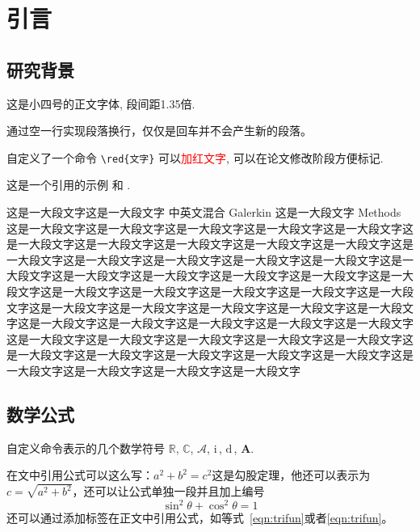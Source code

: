 \documentclass{shnuthesis}
\newcommand{\CC}{\ensuremath{\mathbb{C}}}
\newcommand{\RR}{\ensuremath{\mathbb{R}}}
\newcommand{\A}{\mathcal{A}}
\newcommand{\ii}{\bm{\mathrm{i}}\,}  %
\newcommand{\md}{\mathrm{d}\,}
\newcommand{\bA}{\boldsymbol{A}}
\newcommand{\red}[1]{\textcolor{red}{#1}}
\begin{document}
    \maketoc[pagenumtoc]


	\clearpage %

    \mainmatter



\chapter{引言}

\section{研究背景}
这是小四号的正文字体, 段间距1.35倍.
	
通过空一行实现段落换行，仅仅是回车并不会产生新的段落。

自定义了一个命令 \verb|\red{文字}| 可以\red{加红文字}, 可以在论文修改阶段方便标记.

这是一个引用的示例 \cite{Adams1975}和 \cite{Shen1994,Tadmor2012}.

这是一大段文字这是一大段文字 中英文混合 Galerkin 这是一大段文字 Methods 这是一大段文字这是一大段文字这是一大段文字这是一大段文字这是一大段文字这是一大段文字这是一大段文字这是一大段文字这是一大段文字这是一大段文字这是一大段文字这是一大段文字这是一大段文字这是一大段文字这是一大段文字这是一大段文字这是一大段文字这是一大段文字这是一大段文字这是一大段文字这是一大段文字这是一大段文字这是一大段文字这是一大段文字这是一大段文字这是一大段文字这是一大段文字这是一大段文字这是一大段文字这是一大段文字这是一大段文字这是一大段文字这是一大段文字这是一大段文字这是一大段文字这是一大段文字这是一大段文字这是一大段文字这是一大段文字这是一大段文字这是一大段文字这是一大段文字这是一大段文字这是一大段文字这是一大段文字这是一大段文字这是一大段文字这是一大段文字这是一大段文字这是一大段文字


\section{数学公式}

自定义命令表示的几个数学符号 $\RR$, $\CC$, $\A$, $\ii$, $\md$, $\bA$.

在文中引用公式可以这么写：$a^2+b^2=c^2$这是勾股定理，他还可以表示为$c=\sqrt{a^2+b^2}$，还可以让公式单独一段并且加上编号
\begin{equation}\label{eqn:trifun}
\sin^2{\theta}+\cos^2{\theta}=1
\end{equation}
还可以通过添加标签在正文中引用公式，如等式~\eqref{eqn:trifun}或者\ref{eqn:trifun}。
\end{document}
